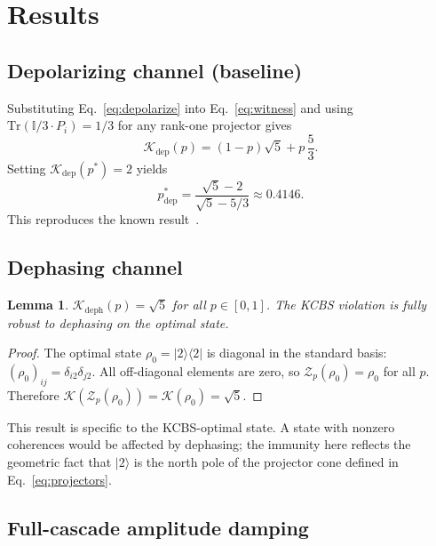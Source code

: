 \documentclass[twocolumn,showpacs,preprintnumbers,amsmath,amssymb,prl]{revtex4-2}
\newcommand{\ket}[1]{|#1\rangle}
\newcommand{\bra}[1]{\langle #1|}
\newcommand{\tr}{\mathrm{Tr}}
\newtheorem{lemma}{Lemma}
\newcommand{\K}{\mathcal{K}}          %
\newcommand{\pstar}{p^{*}}            %
\newcommand{\Id}{\mathbb{I}}          %
\begin{document}
\section{Results}
\label{sec:results}

\subsection{Depolarizing channel (baseline)}
\label{sec:depolarizing}

Substituting Eq.~\eqref{eq:depolarize} into Eq.~\eqref{eq:witness} and using
$\tr(\Id/3 \cdot P_i) = 1/3$ for any rank-one projector gives
\begin{equation}
  \K_{\mathrm{dep}}(p) = (1-p)\sqrt{5} + p\,\frac{5}{3}.
  \label{eq:K_dep}
\end{equation}
Setting $\K_{\mathrm{dep}}(\pstar) = 2$ yields
\begin{equation}
  \pstar_{\mathrm{dep}} = \frac{\sqrt{5}-2}{\sqrt{5}-5/3} \approx 0.4146.
  \label{eq:pstar_dep}
\end{equation}
This reproduces the known result~\cite{Klyachko2008,Dutra2026}.

\subsection{Dephasing channel}
\label{sec:dephasing}

\begin{lemma}
  $\K_{\mathrm{deph}}(p) = \sqrt{5}$ for all $p \in [0,1]$.
  The KCBS violation is fully robust to dephasing on the optimal state.
\end{lemma}

\begin{proof}
  The optimal state $\rho_0 = \ket{2}\bra{2}$ is diagonal in the standard
  basis: $(\rho_0)_{ij} = \delta_{i2}\delta_{j2}$.
  All off-diagonal elements are zero, so $\mathcal{Z}_p(\rho_0) = \rho_0$ for
  all $p$.
  Therefore $\K(\mathcal{Z}_p(\rho_0)) = \K(\rho_0) = \sqrt{5}$.
\end{proof}

This result is specific to the KCBS-optimal state.
A state with nonzero coherences would be affected by dephasing; the immunity
here reflects the geometric fact that $\ket{2}$ is the north pole of the
projector cone defined in Eq.~\eqref{eq:projectors}.

\subsection{Full-cascade amplitude damping}
\label{sec:amplitude_damping}
\end{document}
